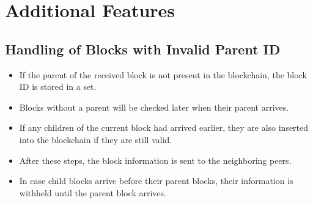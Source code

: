 \documentclass[a4paper,12pt]{article}
\begin{document}
\section*{Additional Features}

\subsection*{Handling of Blocks with Invalid Parent ID}

\begin{itemize}
    \item If the parent of the received block is not present in the blockchain, the block ID is stored in a set.
    \item Blocks without a parent will be checked later when their parent arrives.
    \item If any children of the current block had arrived earlier, they are also inserted into the blockchain if they are still valid.
    \item After these steps, the block information is sent to the neighboring peers.
    \item In case child blocks arrive before their parent blocks, their information is withheld until the parent block arrives.
\end{itemize}
\end{document}

